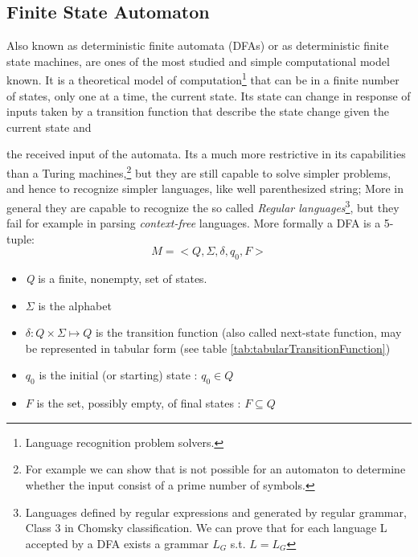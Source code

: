 \subsection{Finite State Automaton}\label{DFA}
Also known as deterministic finite automata (DFAs) or as deterministic finite
state machines, are ones of the most studied and simple computational model
known.
 It is a theoretical model of computation\footnote{Language recognition
problem solvers.} that can be in a finite number of states, only one at a time,
the current state. Its state can change in response of inputs taken by a
transition function that describe the state change given the current state and
\begin{table}
 \caption{Tabular representation of a DFM's next-state function}
 \label{tab:tabularTransitionFunction}
\end{table} 
the received input of the automata.
Its a much more restrictive in its capabilities than a Turing
machines,\footnote{For example we can show that is not possible for an
automaton to determine whether the input consist of a prime number of symbols.}
but they are still capable to solve simpler problems, and hence to recognize
simpler languages, like well parenthesized string; More in general they are capable
to recognize the so called \emph{Regular languages}\footnote{Languages
defined by regular expressions and generated by regular grammar, Class 3 in
Chomsky classification. We can prove that for each language L accepted by a DFA
exists a grammar $L_G $ s.t. $ L=L_G$},
but they fail for example in parsing \emph{context-free} languages.
More formally a DFA is a 5-tuple:
\[M = <Q,\Sigma,\delta,q_0,F>\] 

\begin{itemize}
  \item \textit{Q} is a finite, nonempty, set of states.
\item $\Sigma$ is the alphabet
\item $ \delta : Q \times \Sigma \longmapsto Q  $ is the
transition function (also called next-state function, may be represented in
tabular form  (see table
\ref{tab:tabularTransitionFunction})
\item $q_0 $ is the initial (or starting) state :
$ q_0 \in  Q $
\item  $F $ is the set, possibly empty, of final states :
$ F \subseteq Q $

\end{itemize}



